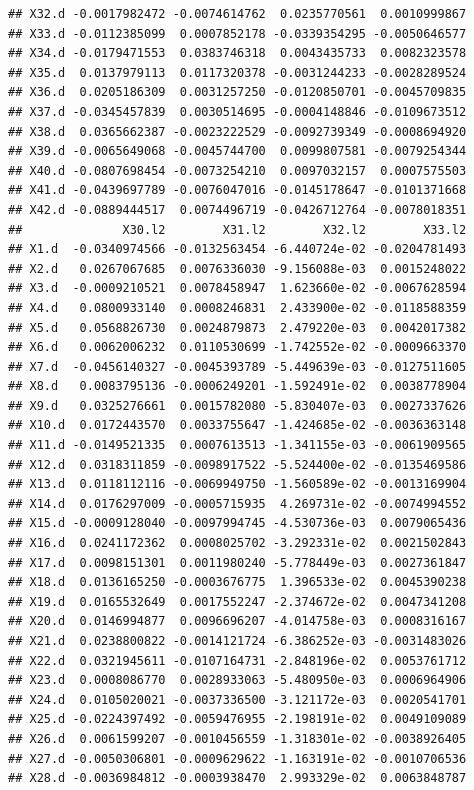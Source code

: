 \documentclass[]{article}
\begin{document}
\begin{verbatim}
## X32.d -0.0017982472 -0.0074614762  0.0235770561  0.0010999867
## X33.d -0.0112385099  0.0007852178 -0.0339354295 -0.0050646577
## X34.d -0.0179471553  0.0383746318  0.0043435733  0.0082323578
## X35.d  0.0137979113  0.0117320378 -0.0031244233 -0.0028289524
## X36.d  0.0205186309  0.0031257250 -0.0120850701 -0.0045709835
## X37.d -0.0345457839  0.0030514695 -0.0004148846 -0.0109673512
## X38.d  0.0365662387 -0.0023222529 -0.0092739349 -0.0008694920
## X39.d -0.0065649068 -0.0045744700  0.0099807581 -0.0079254344
## X40.d -0.0807698454 -0.0073254210  0.0097032157  0.0007575503
## X41.d -0.0439697789 -0.0076047016 -0.0145178647 -0.0101371668
## X42.d -0.0889444517  0.0074496719 -0.0426712764 -0.0078018351
##              X30.l2        X31.l2        X32.l2        X33.l2
## X1.d  -0.0340974566 -0.0132563454 -6.440724e-02 -0.0204781493
## X2.d   0.0267067685  0.0076336030 -9.156088e-03  0.0015248022
## X3.d  -0.0009210521  0.0078458947  1.623660e-02 -0.0067628594
## X4.d   0.0800933140  0.0008246831  2.433900e-02 -0.0118588359
## X5.d   0.0568826730  0.0024879873  2.479220e-03  0.0042017382
## X6.d   0.0062006232  0.0110530699 -1.742552e-02 -0.0009663370
## X7.d  -0.0456140327 -0.0045393789 -5.449639e-03 -0.0127511605
## X8.d   0.0083795136 -0.0006249201 -1.592491e-02  0.0038778904
## X9.d   0.0325276661  0.0015782080 -5.830407e-03  0.0027337626
## X10.d  0.0172443570  0.0033755647 -1.424685e-02 -0.0036363148
## X11.d -0.0149521335  0.0007613513 -1.341155e-03 -0.0061909565
## X12.d  0.0318311859 -0.0098917522 -5.524400e-02 -0.0135469586
## X13.d  0.0118112116 -0.0069949750 -1.560589e-02 -0.0013169904
## X14.d  0.0176297009 -0.0005715935  4.269731e-02 -0.0074994552
## X15.d -0.0009128040 -0.0097994745 -4.530736e-03  0.0079065436
## X16.d  0.0241172362  0.0008025702 -3.292331e-02  0.0021502843
## X17.d  0.0098151301  0.0011980240 -5.778449e-03  0.0027361847
## X18.d  0.0136165250 -0.0003676775  1.396533e-02  0.0045390238
## X19.d  0.0165532649  0.0017552247 -2.374672e-02  0.0047341208
## X20.d  0.0146994877  0.0096696207 -4.014758e-03  0.0008316167
## X21.d  0.0238800822 -0.0014121724 -6.386252e-03 -0.0031483026
## X22.d  0.0321945611 -0.0107164731 -2.848196e-02  0.0053761712
## X23.d  0.0008086770  0.0028933063 -5.480950e-03  0.0006964906
## X24.d  0.0105020021 -0.0037336500 -3.121172e-03  0.0020541701
## X25.d -0.0224397492 -0.0059476955 -2.198191e-02  0.0049109089
## X26.d  0.0061599207 -0.0010456559 -1.318301e-02 -0.0038926405
## X27.d -0.0050306801 -0.0009629622 -1.163191e-02 -0.0010706536
## X28.d -0.0036984812 -0.0003938470  2.993329e-02  0.0063848787

\end{verbatim}
\end{document}
